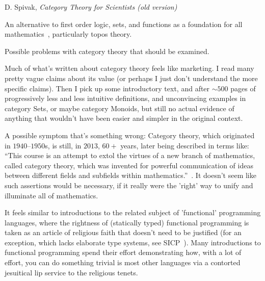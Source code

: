 \documentclass[11pt,openany]{article}
\begin{document}
{D. Spivak, \textit{Category Theory for Scientists 
(old version)}~\cite{spivakd2013}}

\pagebreak
An alternative to first order logic, sets, 
and functions as a foundation for all
mathematics~\cite{feferman1977Categorical},  
particularly topos theory.


\setcounter{currentlevel}{\value{baseSectionLevel}}
\label{sec:Doubts}

Possible problems with category theory that should be examined.


\label{sec:Hype}

Much of what's written about category theory feels like marketing.
I read many pretty vague claims about its value
(or perhaps I just don't understand the more specific claims).
Then I pick up some introductory text,
and after $\sim 500$ pages of progressively less and less 
intuitive definitions, and unconvincing examples in category Sets,
or maybe category Monoids,
but still no actual evidence of anything that wouldn't have been
easier and simpler in the original context.

A possible symptom that's something wrong:
Category theory, which originated in $1940$--$1950$s,
is still, in $2013$, $60+$ years, later being described in terms like:
``This course is an attempt to extol the virtues of a new branch of mathematics,
called category theory, which was invented for powerful communication of ideas between
different fields and subfields within mathematics.''~\cite{spivakd2013}.
It doesn't seem like such assertions would be necessary,
if it really were the 'right' way to unify 
and illuminate all of mathematics.

It feels similar to introductions to the related subject of
'functional' programming languages,
where the rightness of (statically typed) functional programming 
is taken as
an article of religious faith that doesn't need to be justified
(for an exception, which lacks elaborate type systems,
see SICP~\cite{Abelson1996}).
Many introductions to functional programming spend their
effort demonstrating how, with a lot of effort, you can do
something trivial is most other languages
via a contorted jesuitical lip service to the religious tenets.

\label{sec:Shaky-foundations}
\end{document}
